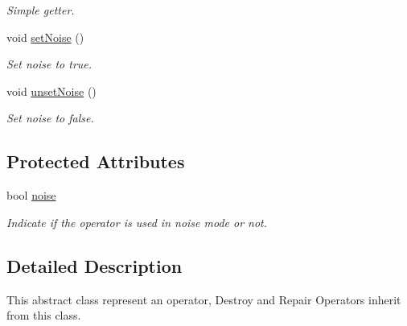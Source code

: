 \begin{DoxyCompactItemize}
\begin{DoxyCompactList}\small\item\em Simple getter. \end{DoxyCompactList}\item 
\hypertarget{classAOperator_ae372929e08da0ad6fb960a4519f33a17}{void \hyperlink{classAOperator_ae372929e08da0ad6fb960a4519f33a17}{set\-Noise} ()}\label{classAOperator_ae372929e08da0ad6fb960a4519f33a17}

\begin{DoxyCompactList}\small\item\em Set noise to true. \end{DoxyCompactList}\item 
\hypertarget{classAOperator_ab1d6a25e233ec1383b9919f8dff098f1}{void \hyperlink{classAOperator_ab1d6a25e233ec1383b9919f8dff098f1}{unset\-Noise} ()}\label{classAOperator_ab1d6a25e233ec1383b9919f8dff098f1}

\begin{DoxyCompactList}\small\item\em Set noise to false. \end{DoxyCompactList}\end{DoxyCompactItemize}
\subsection*{Protected Attributes}
\begin{DoxyCompactItemize}
\item 
\hypertarget{classAOperator_a1af750db671389c8d7e4b8a3691dd6aa}{bool \hyperlink{classAOperator_a1af750db671389c8d7e4b8a3691dd6aa}{noise}}\label{classAOperator_a1af750db671389c8d7e4b8a3691dd6aa}

\begin{DoxyCompactList}\small\item\em Indicate if the operator is used in noise mode or not. \end{DoxyCompactList}\end{DoxyCompactItemize}


\subsection{Detailed Description}
This abstract class represent an operator, Destroy and Repair Operators inherit from this class. 

